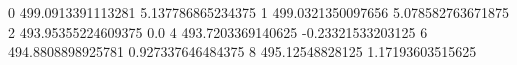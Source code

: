 0 499.0913391113281 5.137786865234375
1 499.0321350097656 5.078582763671875
2 493.95355224609375 0.0
4 493.7203369140625 -0.23321533203125
6 494.8808898925781 0.927337646484375
8 495.12548828125 1.17193603515625
